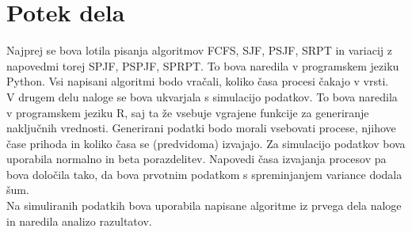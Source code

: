 \documentclass[a4paper, pt14]{article}
\begin{document}
\newpage
\section{Potek dela}

Najprej se bova lotila pisanja algoritmov FCFS, SJF, PSJF, SRPT in variacij z napovedmi torej SPJF, PSPJF, SPRPT. 
To bova naredila v programskem jeziku Python.
Vsi napisani algoritmi bodo vračali, koliko časa procesi čakajo v vrsti.\\
V drugem delu naloge se bova ukvarjala s simulacijo podatkov. To bova naredila v programskem jeziku R, saj ta že vsebuje vgrajene funkcije za generiranje naključnih vrednosti.
Generirani podatki bodo morali vsebovati procese, njihove čase prihoda in koliko časa se (predvidoma) izvajajo.
Za simulacijo podatkov bova uporabila normalno in beta porazdelitev. 
Napovedi časa izvajanja procesov pa bova določila tako, da bova prvotnim podatkom s spreminjanjem variance dodala šum. \\
Na simuliranih podatkih bova uporabila napisane algoritme iz prvega dela naloge in naredila analizo razultatov.
\end{document}
